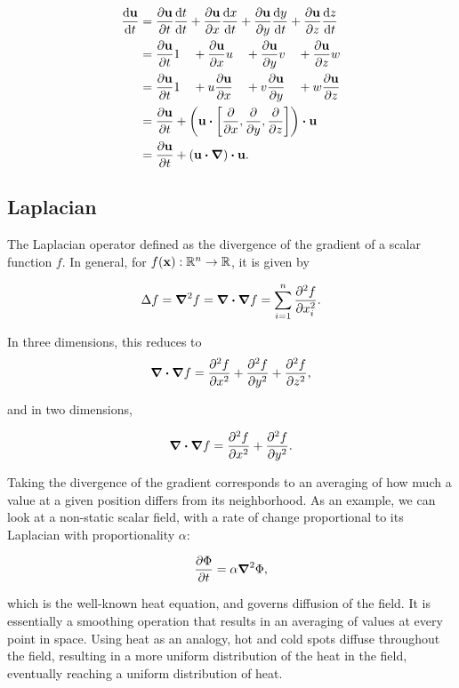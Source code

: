 \begin{alignat*}{2}\label{eq:material-derivative}
    \dv{\vb{u}}{t} &= \pdv{\vb{u}}{t}\dv{t}{t} 
                    + \pdv{\vb{u}}{x}\dv{x}{t} 
                    + \pdv{\vb{u}}{y}\dv{y}{t} 
                    + \pdv{\vb{u}}{z}\dv{z}{t} \\
                    &= \pdv{\vb{u}}{t} 1 \quad
                    + \pdv{\vb{u}}{x} u \quad
                    + \pdv{\vb{u}}{y} v \quad
                    + \pdv{\vb{u}}{z} w \\
                    &= \pdv{\vb{u}}{t} 1 \quad
                    + u \pdv{\vb{u}}{x} \quad
                    + v \pdv{\vb{u}}{y} \quad
                    + w \pdv{\vb{u}}{z} \\
                    &= \pdv{\vb{u}}{t} +
                    \qty(
                        \vb{u}
                        \vdot
                        \left[ \pdv{x}, \pdv{y}, \pdv{z} \right]
                    ) \vdot \vb{u} \\
                    &= \pdv{\vb{u}}{t}
                    + \qty(\vb{u}\vdot\grad)\vdot\vb{u}.
\end{alignat*}

\subsection*{Laplacian}
The Laplacian operator defined as the divergence of the gradient of a scalar
function $f$. In general, for $f(\vb{x}): \mathbb{R}^n \to \mathbb{R}$, it is
given by

    $$\Delta f = \grad^2{f} = \grad \vdot \grad f = \sum_{i=1}^n
\pdv[2]{f}{x_i}.$$

In three dimensions, this reduces to 
$$\grad \vdot \grad f = \pdv[2]{f}{x} + \pdv[2]{f}{y} + \pdv[2]{f}{z},$$

and in two dimensions,

$$ \grad \vdot \grad f = \pdv[2]{f}{x} + \pdv[2]{f}{y}.$$

Taking the divergence of the gradient corresponds to an averaging of how much
a value at a given position differs from its neighborhood. As an example, we
can look at a non-static scalar field, with a rate of change proportional to
its Laplacian with proportionality $\alpha$:

$$
    \pdv{\Phi}{t} = \alpha \grad^2\Phi,
$$

which is the well-known heat equation, and governs diffusion of the field. It is
essentially a smoothing operation that results in an averaging of values at
every point in space. Using heat as an analogy, hot and cold spots diffuse
throughout the field, resulting in a more uniform distribution of the heat in
the field, eventually reaching a uniform distribution of heat.

